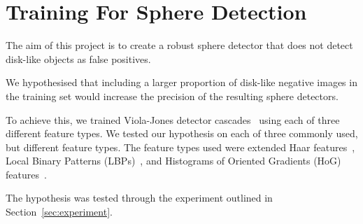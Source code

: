 \documentclass{llncs}
\begin{document}
	\section{Training For Sphere Detection} {

		The aim of this project is to create a robust sphere detector that does not detect disk-like objects as false positives.

		We hypothesised that including a larger proportion of disk-like negative images in the training set would increase the precision of the resulting sphere detectors.

		To achieve this, we trained Viola-Jones detector cascades~\citep{viola2001rapid} using each of three different feature types. We tested our hypothesis on each of three commonly used, but different feature types. The feature types used were extended Haar features~\citep{Lienhart2002extended}, Local Binary Patterns (LBPs)~\citep{liao2007learning}, and Histograms of Oriented Gradients (HoG) features~\citep{dalal2005histograms}.

		The hypothesis was tested through the experiment outlined in Section~\ref{sec:experiment}.

	}
\end{document}
